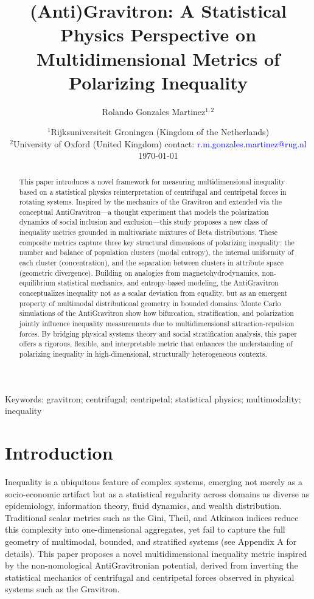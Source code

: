 \documentclass[11pt]{article}
\title{(Anti)Gravitron: A Statistical Physics Perspective on Multidimensional Metrics of Polarizing Inequality}
\author{Rolando Gonzales Martinez$^{1,2}$}
\date{%
    $^1$Rijksuniversiteit Groningen (Kingdom of the Netherlands) \\%
    $^2$University of Oxford (United Kingdom) \newline contact: \textcolor{blue}{r.m.gonzales.martinez@rug.nl} \\[2ex]%
    \today
}
\begin{document}
\maketitle

\begin{abstract}
\noindent 
This paper introduces a novel framework for measuring multidimensional inequality based on a statistical physics reinterpretation of centrifugal and centripetal forces in rotating systems. Inspired by the mechanics of the Gravitron and extended via the conceptual AntiGravitron---a thought experiment that models the polarization dynamics of social inclusion and exclusion---this study proposes a new class of inequality metrics grounded in multivariate mixtures of Beta distributions. These composite metrics capture three key structural dimensions of polarizing inequality: the number and balance of population clusters (modal entropy), the internal uniformity of each cluster (concentration), and the separation between clusters in attribute space (geometric divergence). Building on analogies from magnetohydrodynamics, non-equilibrium statistical mechanics, and entropy-based modeling, the AntiGravitron conceptualizes inequality not as a scalar deviation from equality, but as an emergent property of multimodal distributional geometry in bounded domains. Monte Carlo simulations of the AntiGravitron show how bifurcation, stratification, and polarization jointly influence inequality measurements due to multidimensional attraction-repulsion forces. By bridging physical systems theory and social stratification analysis, this paper offers a rigorous, flexible, and interpretable metric that enhances the understanding of polarizing inequality in high-dimensional, structurally heterogeneous contexts.
\end{abstract}

Keywords: gravitron; centrifugal; centripetal; statistical physics; multimodality; inequality


\newpage

\section{Introduction}

Inequality is a ubiquitous feature of complex systems, emerging not merely as a socio-economic artifact but as a statistical regularity across domains as diverse as epidemiology, information theory, fluid dynamics, and wealth distribution. Traditional scalar metrics such as the Gini, Theil, and Atkinson indices reduce this complexity into one-dimensional aggregates, yet fail to capture the full geometry of multimodal, bounded, and stratified systems (see Appendix A for details). This paper proposes a novel multidimensional inequality metric inspired by the non-nomological AntiGravitronian potential, derived from inverting the statistical mechanics of centrifugal and centripetal forces observed in physical systems such as the Gravitron.
\end{document}
